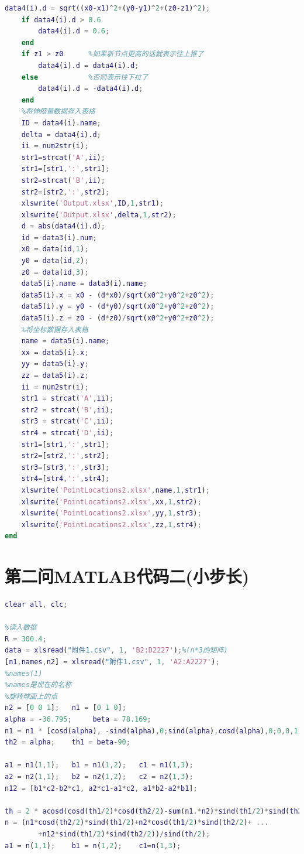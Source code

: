 \documentclass[withoutpreface,bwprint]{cumcmthesis} %
\begin{document}
\begin{appendices}
\begin{lstlisting}[language=matlab]
    data4(i).d = sqrt((x0-x1)^2+(y0-y1)^2+(z0-z1)^2);
    if data4(i).d > 0.6
        data4(i).d = 0.6;
    end
    if z1 > z0      %如果新节点更高的话就表示往上推了
        data4(i).d = data4(i).d;
    else            %否则表示往下拉了
        data4(i).d = -data4(i).d;
    end
    %将伸缩量数据存入表格
    ID = data4(i).name;
    delta = data4(i).d;
    ii = num2str(i);
    str1=strcat('A',ii);
    str1=[str1,':',str1];
    str2=strcat('B',ii);
    str2=[str2,':',str2];
    xlswrite('Output.xlsx',ID,1,str1);
    xlswrite('Output.xlsx',delta,1,str2);
    d = abs(data4(i).d);
    id = data3(i).num;
    x0 = data(id,1);
    y0 = data(id,2);
    z0 = data(id,3);
    data5(i).name = data3(i).name;
    data5(i).x = x0 - (d*x0)/sqrt(x0^2+y0^2+z0^2);
    data5(i).y = y0 - (d*y0)/sqrt(x0^2+y0^2+z0^2);
    data5(i).z = z0 - (d*z0)/sqrt(x0^2+y0^2+z0^2);
    %将坐标数据存入表格
    name = data5(i).name;
    xx = data5(i).x;
    yy = data5(i).y;
    zz = data5(i).z;
    ii = num2str(i);
    str1 = strcat('A',ii);
    str2 = strcat('B',ii);
    str3 = strcat('C',ii);
    str4 = strcat('D',ii);
    str1=[str1,':',str1];
    str2=[str2,':',str2];
    str3=[str3,':',str3];
    str4=[str4,':',str4];
    xlswrite('PointLocations2.xlsx',name,1,str1);
    xlswrite('PointLocations2.xlsx',xx,1,str2);
    xlswrite('PointLocations2.xlsx',yy,1,str3);
    xlswrite('PointLocations2.xlsx',zz,1,str4);
end

\end{lstlisting}
\section{第二问MATLAB代码二(小步长)}
\begin{lstlisting}[language=matlab]
clear all, clc;

%读入数据
R = 300.4;
data = xlsread("附件1.csv", 1, 'B2:D2227');%(n*3的矩阵)
[n1,names,n2] = xlsread("附件1.csv", 1, 'A2:A2227');
%names(1)
%names是现在的名称
%旋转球面上的点
n2 = [0 0 1];   n1 = [0 1 0];   
alpha = -36.795;     beta = 78.169;
n1 = n1 * [cosd(alpha), -sind(alpha),0;sind(alpha),cosd(alpha),0;0,0,1]
th2 = alpha;    th1 = beta-90;

a1 = n1(1,1);   b1 = n1(1,2);   c1 = n1(1,3);
a2 = n2(1,1);   b2 = n2(1,2);   c2 = n2(1,3);
n12 = [b1*c2-b2*c1, a2*c1-a1*c2, a1*b2-a2*b1];

th = 2 * acosd(cosd(th1/2)*cosd(th2/2)-sum(n1.*n2)*sind(th1/2)*sind(th2/2));
n = (n1*cosd(th2/2)*sind(th1/2)+n2*cosd(th1/2)*sind(th2/2)+ ...
        +n12*sind(th1/2)*sind(th2/2))/sind(th/2);
a1 = n(1,1);    b1 = n(1,2);    c1=n(1,3);


\end{lstlisting}
\end{appendices}
\end{document}
